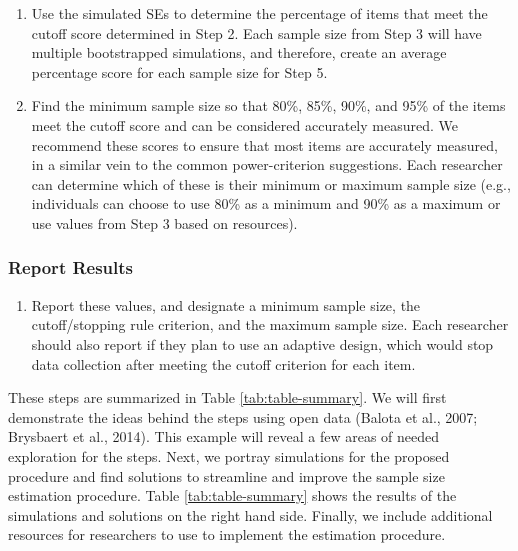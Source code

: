 \documentclass[
  man]{apa7}
\providecommand{\tightlist}{%
  \setlength{\itemsep}{0pt}\setlength{\parskip}{0pt}}
\begin{document}
\begin{enumerate}
\def\labelenumi{\arabic{enumi})}
\setcounter{enumi}{3}
\item
  Use the simulated SEs to determine the percentage of items that meet the cutoff score determined in Step 2. Each sample size from Step 3 will have multiple bootstrapped simulations, and therefore, create an average percentage score for each sample size for Step 5.
\item
  Find the minimum sample size so that 80\%, 85\%, 90\%, and 95\% of the items meet the cutoff score and can be considered accurately measured. We recommend these scores to ensure that most items are accurately measured, in a similar vein to the common power-criterion suggestions. Each researcher can determine which of these is their minimum or maximum sample size (e.g., individuals can choose to use 80\% as a minimum and 90\% as a maximum or use values from Step 3 based on resources).
\end{enumerate}

\hypertarget{report-results}{%
\subsubsection{Report Results}\label{report-results}}

\begin{enumerate}
\def\labelenumi{\arabic{enumi})}
\setcounter{enumi}{5}
\tightlist
\item
  Report these values, and designate a minimum sample size, the cutoff/stopping rule criterion, and the maximum sample size. Each researcher should also report if they plan to use an adaptive design, which would stop data collection after meeting the cutoff criterion for each item.
\end{enumerate}

These steps are summarized in Table \ref{tab:table-summary}. We will first demonstrate the ideas behind the steps using open data (Balota et al., 2007; Brysbaert et al., 2014). This example will reveal a few areas of needed exploration for the steps. Next, we portray simulations for the proposed procedure and find solutions to streamline and improve the sample size estimation procedure. Table \ref{tab:table-summary} shows the results of the simulations and solutions on the right hand side. Finally, we include additional resources for researchers to use to implement the estimation procedure.
\end{document}

